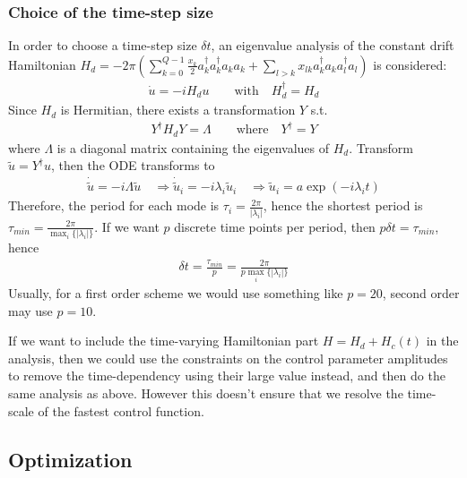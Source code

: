 \documentclass[letterpaper]{article}
\begin{document}
    \subsubsection{Choice of the time-step size}
    In order to choose a time-step size $\delta t$, an eigenvalue analysis of
    the constant drift Hamiltonian $H_d =  -2\pi \left(\sum_{k=0}^{Q-1} \frac{x_k}{2}
    a_k^{\dagger}a_k^{\dagger}a_ka_k + \sum_{l>k} x_{lk}
    a_{k}^{\dagger}a_{k}
    a_{l}^{\dagger}a_{l}\right)$ is considered:
       \begin{align*}  
         \dot u = -i H_d u \qquad \text{with} \quad H_d^{\dagger}  = H_d
       \end{align*} 
       Since $H_d$ is Hermitian, there exists a transformation $Y$ s.t. 
       \begin{align*}
         Y^{\dagger}H_d Y = \Lambda \qquad  \text{where} \quad Y^{\dagger} = Y
       \end{align*}
       where $\Lambda$ is a diagonal matrix containing the eigenvalues of $H_d$.
       Transform $\tilde u = Y^{\dagger} u$, then the ODE transforms to 
       \begin{align*}
         \dot \tilde u = -i \Lambda \tilde u \quad \Rightarrow \dot \tilde u_i =
         -i\lambda_i \tilde u_i \quad \Rightarrow \tilde u_i = a
         \exp(-i\lambda_i t)
       \end{align*}
       Therefore, the period for each mode is $\tau_i =
       \frac{2\pi}{|\lambda_i|}$, hence the shortest period is $\tau_{min} =
       \frac{2\pi}{\max_i\{|\lambda_i|\}}$. If we want $p$ discrete time points
       per period, then $p\delta t = \tau_{min}$, hence 
       \begin{align*}
         \delta t = \frac{\tau_{min}}{p} = \frac{2\pi}{p\max_i\{|\lambda_i|\}}
       \end{align*}
       Usually, for a first order scheme we would use something like $p=20$,
       second order may use $p=10$. 

       If we want to include the time-varying Hamiltonian part $H = H_d +
       H_c(t)$ in the analysis, then we could use the constraints on the control
       parameter amplitudes to remove the time-dependency using their large
       value instead, and then do the same analysis as above. However this
       doesn't ensure that we resolve the time-scale of the fastest control
       function. 
      
\subsection{Optimization}
\end{document}

